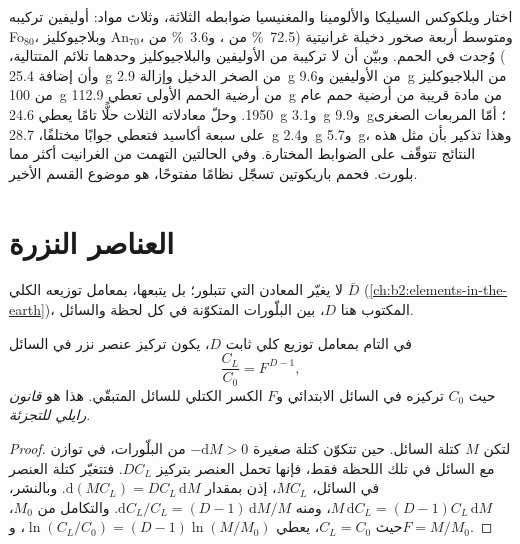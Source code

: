 اختار ويلكوكس السيليكا والألومينا والمغنيسيا ضوابطه الثلاثة، وثلاث
مواد: أوليفين تركيبه Fo$_{80}$، وبلاجيوكليز An$_{70}$، ومتوسط
أربعة صخور دخيلة غرانيتية (\qty{72.5}{\percent} من ، و\qty{3.6}{\percent} من
) وُجدت في الحمم. وبيّن أن لا تركيبة من الأوليفين
والبلاجيوكليز وحدهما تلائم المتتالية، وأن إضافة \qty{25.4}{g} من الصخر الدخيل
وإزالة \qty{2.9}{g} من الأوليفين و\qty{9.6}{g} من البلاجيوكليز من
\qty{100}{g} من أرضية الحمم الأولى تعطي \qty{112.9}{g} من مادة
قريبة من أرضية حمم عام 1950. وحلّ معادلاته الثلاث حلًّا تامًا
يعطي \qty{24.6}{g} و\qty{3.1}{g} و\qty{9.9}{g}؛ أمّا المربعات الصغرى على سبعة أكاسيد
فتعطي جوابًا مختلفًا، \qty{28.7}{g} و\qty{2.4}{g} و\qty{5.7}{g}، وهذا تذكير
بأن مثل هذه النتائج تتوقّف على الضوابط المختارة. وفي الحالتين التهمت  من
الغرانيت أكثر مما بلورت. فحمم باريكوتين تسجّل نظامًا مفتوحًا، هو
موضوع القسم الأخير.

\section{العناصر النزرة}\label{sec:b2:magmatic-differentiation:trace}

لا يغيّر  المعادن التي تتبلور؛ بل يتبعها،
بمعامل توزيعه الكلي $\bar D$ (\cref{ch:b2:elements-in-the-earth})،
المكتوب هنا $D$، بين البلّورات المتكوّنة في كل لحظة والسائل.

\begin{theorem}\label{thm:b2:magmatic-differentiation:rayleigh}
في  التام بمعامل توزيع كلي ثابت
$D$، يكون تركيز عنصر نزر في السائل
\[
\frac{C_L}{C_0} = F^{\,D-1},
\]
حيث $C_0$ تركيزه في السائل الابتدائي و$F$ الكسر الكتلي
للسائل المتبقّي. هذا هو \emph{قانون رايلي للتجزئة}.
\end{theorem}

\begin{proof}
لتكن $M$ كتلة السائل. حين تتكوّن كتلة صغيرة $-\mathrm dM > 0$ من البلّورات،
في توازن مع السائل في تلك اللحظة فقط، فإنها تحمل العنصر بتركيز
$DC_L$. فتتغيّر كتلة العنصر في السائل، $MC_L$، إذن
بمقدار $\mathrm d(MC_L) = DC_L\,\mathrm dM$. وبالنشر، $M\,\mathrm dC_L = (D-1)C_L\,
\mathrm dM$، ومنه $\mathrm dC_L/C_L = (D-1)\,\mathrm dM/M$. والتكامل من $M_0$،
حيث $C_L = C_0$، يعطي $\ln(C_L/C_0) = (D-1)\ln(M/M_0)$، و$F = M/M_0$.
\end{proof}

